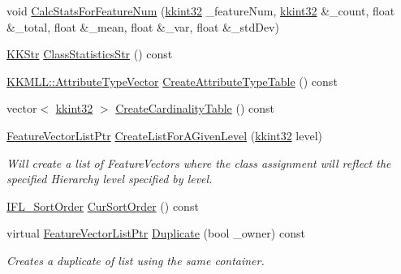 \begin{DoxyCompactItemize}
void \hyperlink{class_k_k_m_l_l_1_1_feature_vector_list_ac2a409481473e0c3cf3cdae64f156d41}{Calc\+Stats\+For\+Feature\+Num} (\hyperlink{namespace_k_k_b_a8fa4952cc84fda1de4bec1fbdd8d5b1b}{kkint32} \+\_\+feature\+Num, \hyperlink{namespace_k_k_b_a8fa4952cc84fda1de4bec1fbdd8d5b1b}{kkint32} \&\+\_\+count, float \&\+\_\+total, float \&\+\_\+mean, float \&\+\_\+var, float \&\+\_\+std\+Dev)
\item 
\hyperlink{class_k_k_b_1_1_k_k_str}{K\+K\+Str} \hyperlink{class_k_k_m_l_l_1_1_feature_vector_list_ae88ff8d104ecfa4e8d2f03b14b6ada30}{Class\+Statistics\+Str} () const 
\item 
\hyperlink{class_k_k_m_l_l_1_1_attribute_type_vector}{K\+K\+M\+L\+L\+::\+Attribute\+Type\+Vector} \hyperlink{class_k_k_m_l_l_1_1_feature_vector_list_ae78e3b459c3b52ab9a5a9f642ddd428b}{Create\+Attribute\+Type\+Table} () const 
\item 
vector$<$ \hyperlink{namespace_k_k_b_a8fa4952cc84fda1de4bec1fbdd8d5b1b}{kkint32} $>$ \hyperlink{class_k_k_m_l_l_1_1_feature_vector_list_adb4f5c2776b9a173ea182af89eea2495}{Create\+Cardinality\+Table} () const 
\item 
\hyperlink{class_k_k_m_l_l_1_1_feature_vector_list_af22f34b214e0dd3b16760002ce392355}{Feature\+Vector\+List\+Ptr} \hyperlink{class_k_k_m_l_l_1_1_feature_vector_list_a42ed7922caba3a26b7130c0ee288af23}{Create\+List\+For\+A\+Given\+Level} (\hyperlink{namespace_k_k_b_a8fa4952cc84fda1de4bec1fbdd8d5b1b}{kkint32} level)
\begin{DoxyCompactList}\small\item\em Will create a list of Feature\+Vectors where the class assignment will reflect the specified Hierarchy level specified by \textquotesingle{}level\textquotesingle{}. \end{DoxyCompactList}\item 
\hyperlink{class_k_k_m_l_l_1_1_feature_vector_list_a24e87fc6e8ca10537dbcd275bb339a3c}{I\+F\+L\+\_\+\+Sort\+Order} \hyperlink{class_k_k_m_l_l_1_1_feature_vector_list_af97ab422ed92e0e71b4985877ea56d75}{Cur\+Sort\+Order} () const 
\item 
virtual \hyperlink{class_k_k_m_l_l_1_1_feature_vector_list_af22f34b214e0dd3b16760002ce392355}{Feature\+Vector\+List\+Ptr} \hyperlink{class_k_k_m_l_l_1_1_feature_vector_list_a6f3b0f046e5697a9bd6fee1b10e2eb02}{Duplicate} (bool \+\_\+owner) const 
\begin{DoxyCompactList}\small\item\em Creates a duplicate of list using the same container. \end{DoxyCompactList}\item 

\end{DoxyCompactItemize}
